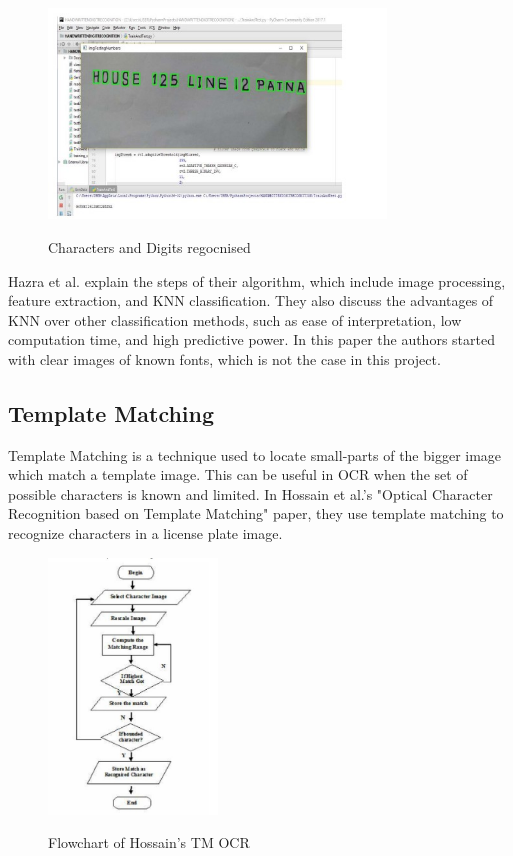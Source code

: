 \begin{figure}[!h]
    \centering
    \includegraphics[width=0.8\textwidth]{Figures/KNN_Hazra.jpg}
    \caption[Optical Character Recognition using KNN on Custom
        Image Dataset]{Characters and Digits regocnised}\cite{joshuaDevelopmentImageProcessing2023}
    \label{fig:Hazra OCR KNN Paper}
\end{figure}

Hazra et al. explain the steps of their algorithm, which include image processing, feature extraction, and KNN classification. They also discuss the advantages of KNN over other classification methods, such as ease of interpretation, low computation time, and high predictive power. In this paper the authors started with clear images of known fonts, which is not the case in this project.


\newpage

\subsection{Template Matching}

Template Matching is a technique used to locate small-parts of the bigger image which match a template image. This can be useful in OCR when the set of possible characters is known and limited. In Hossain et al.'s "Optical Character Recognition based on Template Matching" paper, they use template matching to recognize characters in a license plate image.

\begin{figure}[ht]
    \centering
    \includegraphics[width=0.4\textwidth]{Figures/TM_Hossain.jpg}
    \caption[Flowchart of Template Matching OCR]{Flowchart of Hossain's TM OCR}\cite{hossainOpticalCharacterRecognition2019}
    \label{fig:Hossain OCR Template Matching Paper}
\end{figure}

